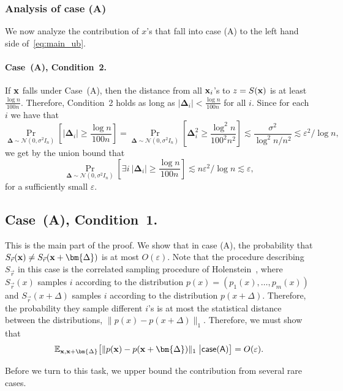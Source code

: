 \documentclass[10pt,a4paper]{article}
\newcommand\card[1]{\left| {#1} \right|}
\newcommand\Prob[2]{{\Pr_{#1}\left[ {#2} \right]}}
\newcommand\cbExpect[3]{{\mathbb{E}_{#1}\big[ \big. #3 \;\big\vert #2 \big]}}
\newcommand\norm[1]{\| #1 \|}
\newcommand\eps{\varepsilon}
\renewcommand\geq{\geqslant}
\newcommand{\De}{\Delta}
\newcommand{\ve}{\varepsilon}
\def\ll{\lesssim}
\begin{document}
\subsubsection{Analysis of case (A)}
We now analyze the contribution of $x$'s that fall into case (A) to the left hand side of~\eqref{eq:main_ub}.
\paragraph{Case~(A), Condition~2.}  If  ${\bf x}$  falls under Case~(A),
then the distance from all ${\bf x}_i$'s to $z=S({\bf x})$ is at least $\frac{\log n}{100 n}$.
Therefore, Condition~2 holds as long as $|\bm{\De}_i| < \frac{\log n}{100 n}$ for all $i$.
Since for each $i$ we have that
\[
\Prob{\bm{\De}\sim\mathcal{N}(0,\sigma^2 I_n)}{\card{\bm{\De}_i}\geq \frac{\log n}{100 n}}
=
\Prob{\bm{\De}\sim\mathcal{N}(0,\sigma^2 I_n)}{\bm{\De}_i^2\geq \frac{\log^2 n}{100^2 n^2}}
\ll \frac{\sigma^2}{\log ^2 n/n^2}
\ll \eps^2/\log n,
\]
we get by the union bound that
\[
\Prob{\bm{\De}\sim\mathcal{N}(0,\sigma^2 I_n)}{\exists i~\card{\bm{\De}_i}\geq \frac{\log n}{100 n}}
\ll n\eps^2/\log n
\ll \eps,
\]
for a sufficiently small $\eps$.


\subsection{Case~(A), Condition~1.}
This is the main part of the proof.
We show that in case (A), the probability that $S_{\vec{r}}({\bf x})\neq S_{\vec{r}}({\bf x}+\bm{\De})$
is at most $O(\eps)$. Note that the procedure describing $S_{\vec{r}}$ in this case
is the correlated sampling  procedure of Holenstein~\cite{Holenstein}, where
$S_{\vec{r}}(x)$ samples $i$ according to
the distribution $p(x) = (p_1(x),\ldots, p_m(x))$ and
$S_{\vec{r}}(x+\De)$ samples $i$ according to the distribution $p(x+\De)$. Therefore,
the probability they sample different $i$'s is at most the statistical distance
between the distributions, $\norm{p(x) - p(x+\De)}_1$. Therefore, we must show that
\begin{equation}\label{eq:mainA1}
\cbExpect{{\bf x},{\bf x}+\bm{\De}}{{\sf case (A)}}{\norm{p({\bf x}) - p({\bf x}+\bm{\De})}_1} = O(\ve).
\end{equation}

Before we turn to this task, we upper bound the contribution from several rare cases.
\end{document}
